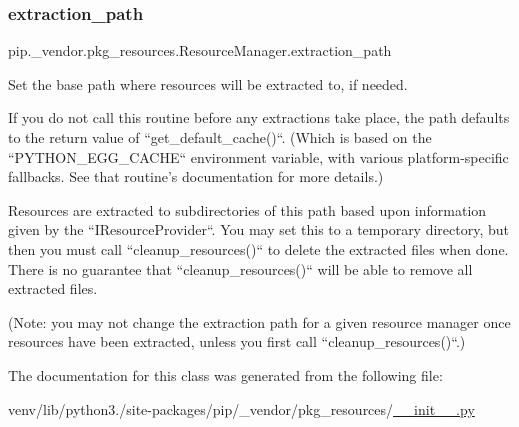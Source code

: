 \mbox{\label{classpip_1_1__vendor_1_1pkg__resources_1_1ResourceManager_aa2b57b775489db4ed4491cfdfc8534cf}} 
\subsubsection{\texorpdfstring{extraction\+\_\+path}{extraction\_path}}
{\footnotesize\ttfamily pip.\+\_\+vendor.\+pkg\+\_\+resources.\+Resource\+Manager.\+extraction\+\_\+path\hspace{0.3cm}{\ttfamily [static]}}

\begin{DoxyVerb}Set the base path where resources will be extracted to, if needed.

If you do not call this routine before any extractions take place, the
path defaults to the return value of ``get_default_cache()``.  (Which
is based on the ``PYTHON_EGG_CACHE`` environment variable, with various
platform-specific fallbacks.  See that routine's documentation for more
details.)

Resources are extracted to subdirectories of this path based upon
information given by the ``IResourceProvider``.  You may set this to a
temporary directory, but then you must call ``cleanup_resources()`` to
delete the extracted files when done.  There is no guarantee that
``cleanup_resources()`` will be able to remove all extracted files.

(Note: you may not change the extraction path for a given resource
manager once resources have been extracted, unless you first call
``cleanup_resources()``.)
\end{DoxyVerb}
 

The documentation for this class was generated from the following file\+:\begin{DoxyCompactItemize}
\item 
venv/lib/python3./site-\/packages/pip/\+\_\+vendor/pkg\+\_\+resources/\hyperlink{venv_2lib_2python3_89_2site-packages_2pip_2__vendor_2pkg__resources_2____init_____8py}{\+\_\+\+\_\+init\+\_\+\+\_\+.\+py}\end{DoxyCompactItemize}

